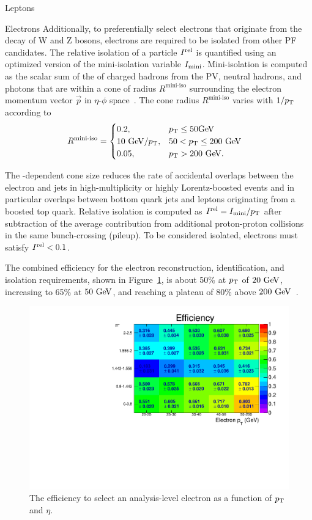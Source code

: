 \begin{section}{Leptons}
\begin{subsection}{Electrons}
Additionally, to preferentially select electrons that originate from the decay of W and Z bosons, electrons are required to be isolated from other PF candidates.
The relative isolation of a particle $I^{\mathrm{rel}}$ is quantified using an optimized version of the mini-isolation variable $I_{\mathrm{mini}}$.
Mini-isolation is computed as the scalar sum of the \pT of charged hadrons from the PV, neutral hadrons, and photons that are within a cone of radius $R^{\text{mini-iso}}$ surrounding the electron momentum vector $\vec{p}$ in $\eta$-$\phi$ space~\cite{Rehermann:2010vq}.
The cone radius $R^{\text{mini-iso}}$ varies with $1/p_{\mathrm{T}}$ according to
\begin{align}
R^{\text{mini-iso}} &=\begin{cases} 0.2, &
p_{\mathrm{T}} \leq 50\mathrm{Ge\kern -0.1em V} \\
{10~\mathrm{Ge\kern -0.1em V}}/{p_{\mathrm{T}}}, & 50 < p_{\mathrm{T}} \leq 200~\mathrm{Ge\kern -0.1em V} \\
0.05, & p_{\mathrm{T}} > 200~\mathrm{Ge\kern -0.1em V}.
\end{cases}
\end{align}

The \pT-dependent cone size reduces the rate of accidental overlaps between the electron and jets in high-multiplicity or highly Lorentz-boosted events and in particular overlaps between bottom quark jets and leptons originating from a boosted top quark.
Relative isolation is computed as $I^{\mathrm{rel}} = I_{\mathrm{mini}}/p_{\mathrm{T}}$ after subtraction of the average contribution from additional proton-proton collisions in the same bunch-crossing (pileup).
To be considered isolated, electrons must satisfy $I^{\mathrm{rel}} < 0.1$.

The combined efficiency for the electron reconstruction, identification, and isolation requirements, shown in Figure~\ref{fig:electron_eff}, is about 50\% at $p_{\mathrm{T}}$ of $20~\mathrm{Ge\kern -0.1em V}$, increasing to 65\% at $50~\mathrm{Ge\kern -0.1em V}$, and reaching a plateau of 80\% above $200~\mathrm{Ge\kern -0.1em V}$~\cite{Khachatryan:2015hwa}.

\begin{figure}[tbp!]
\centering
\includegraphics[angle=0,width=0.80\columnwidth]{fig/electron_eff.pdf}
\caption{The efficiency to select an analysis-level electron as a function of $p_{\mathrm{T}}$ and $\eta$.}
\label{fig:electron_eff}
\end{figure}


\end{subsection}
\end{section}
